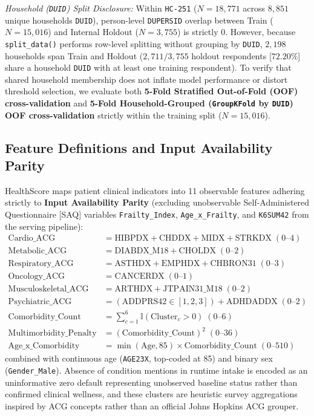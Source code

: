 \documentclass[runningheads]{llncs}
\begin{document}
\noindent\textit{Household (\texttt{DUID}) Split Disclosure:} Within \texttt{HC-251} ($N=18,771$ across $8,851$ unique households \texttt{DUID}), person-level \texttt{DUPERSID} overlap between Train ($N=15,016$) and Internal Holdout ($N=3,755$) is strictly $0$. However, because \texttt{split\_data()} performs row-level splitting without grouping by \texttt{DUID}, $2,198$ households span Train and Holdout ($2,711 / 3,755$ holdout respondents [$72.20\%$] share a household \texttt{DUID} with at least one training respondent). To verify that shared household membership does not inflate model performance or distort threshold selection, we evaluate both \textbf{5-Fold Stratified Out-of-Fold (OOF) cross-validation} and \textbf{5-Fold Household-Grouped (\texttt{GroupKFold} by \texttt{DUID}) OOF cross-validation} strictly within the training split ($N=15,016$).

\subsection{Feature Definitions and Input Availability Parity}
HealthScore maps patient clinical indicators into 11 observable features adhering strictly to \textbf{Input Availability Parity} (excluding unobservable Self-Administered Questionnaire [SAQ] variables \texttt{Frailty\_Index}, \texttt{Age\_x\_Frailty}, and \texttt{K6SUM42} from the serving pipeline):
\begin{align}
\text{Cardio\_ACG} &= \text{HIBPDX} + \text{CHDDX} + \text{MIDX} + \text{STRKDX} \; (0\text{--}4) \\
\text{Metabolic\_ACG} &= \text{DIABDX\_M18} + \text{CHOLDX} \; (0\text{--}2) \\
\text{Respiratory\_ACG} &= \text{ASTHDX} + \text{EMPHDX} + \text{CHBRON31} \; (0\text{--}3) \\
\text{Oncology\_ACG} &= \text{CANCERDX} \; (0\text{--}1) \\
\text{Musculoskeletal\_ACG} &= \text{ARTHDX} + \text{JTPAIN31\_M18} \; (0\text{--}2) \\
\text{Psychiatric\_ACG} &= (\text{ADDPRS42} \in [1,2,3]) + \text{ADHDADDX} \; (0\text{--}2) \\
\text{Comorbidity\_Count} &= \sum_{c=1}^6 \mathbb{I}(\text{Cluster}_c > 0) \; (0\text{--}6) \\
\text{Multimorbidity\_Penalty} &= (\text{Comorbidity\_Count})^2 \; (0\text{--}36) \\
\text{Age\_x\_Comorbidity} &= \min(\text{Age}, 85) \times \text{Comorbidity\_Count} \; (0\text{--}510)
\end{align}
combined with continuous age (\texttt{AGE23X}, top-coded at 85) and binary sex (\texttt{Gender\_Male}). Absence of condition mentions in runtime intake is encoded as an uninformative zero default representing unobserved baseline status rather than confirmed clinical wellness, and these clusters are heuristic survey aggregations inspired by ACG concepts rather than an official Johns Hopkins ACG grouper.
\end{document}

